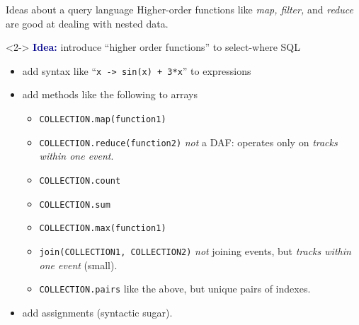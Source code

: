 \documentclass{beamer}
\begin{document}
\begin{frame}{Ideas about a query language}
\vspace{0.25 cm}
Higher-order functions like {\it map, filter,} and {\it reduce} are good at dealing with nested data.

\vspace{0.25 cm}
\begin{uncoverenv}<2->
\textcolor{darkblue}{\bf Idea:} introduce ``higher order functions'' to select-where SQL
\begin{itemize}
\item add syntax like ``{\tt x -> sin(x) + 3*x}'' to expressions
\item add methods like the following to arrays
\begin{itemize}
\item {\tt \scriptsize COLLECTION.map(function1)}
\item {\tt \scriptsize COLLECTION.reduce(function2)} {\it not} a DAF: operates only on {\it tracks within one event}.
\item {\tt \scriptsize COLLECTION.count}
\item {\tt \scriptsize COLLECTION.sum}
\item {\tt \scriptsize COLLECTION.max(function1)}
\item {\tt \scriptsize join(COLLECTION1, COLLECTION2)} {\it not} joining events, but {\it tracks within one event} (small).
\item {\tt \scriptsize COLLECTION.pairs} like the above, but unique pairs of indexes.
\end{itemize}
\item add assignments (syntactic sugar).
\end{itemize}
\end{uncoverenv}
\end{frame}
\end{document}
